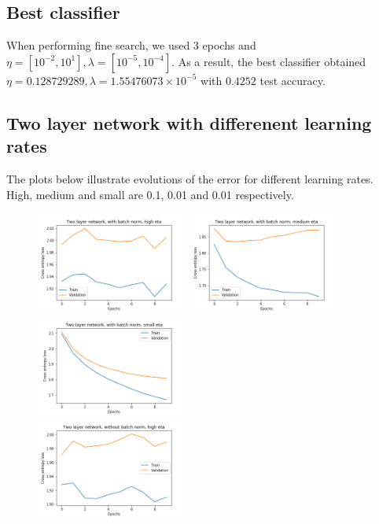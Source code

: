 \documentclass[10pt,a4paper]{article}
\begin{document}
\subsection*{Best classifier}
When performing fine search, we used 3 epochs and $\eta=[10^{-2},10^{1}], \lambda=[10^{-5},10^{-4}]$. As a result, the best classifier obtained $\eta = 0.128729289, \lambda=1.55476073\times10^{-5}$ with $0.4252$ test accuracy.

\subsection*{Two layer network with differenent learning rates}
The plots below illustrate evolutions of the error for different learning rates. High, medium and small are 0.1, 0.01 and 0.01 respectively.

\begin{figure}[H]
	\includegraphics[width=5cm]{res/part4-bn_high.png}
	\includegraphics[width=5cm]{res/part4-bn_medium.png}
	\includegraphics[width=5cm]{res/part4-bn_small.png}
	\\
	\includegraphics[width=5cm]{res/part4-nobn_high.png}

\end{figure}
\end{document}
